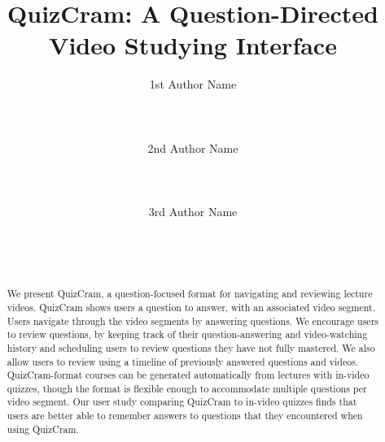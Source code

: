 \documentclass{sigchi}
\begin{document}
\title{QuizCram: A Question-Directed Video Studying Interface}


\author{
  \alignauthor 1st Author Name\\
    \\
    \\
    \\
  \alignauthor 2nd Author Name\\
    \\
    \\
    \\
  \alignauthor 3rd Author Name\\
    \\
    \\
    \\
}

\maketitle

\begin{abstract}
We present QuizCram, a question-focused format for navigating and reviewing lecture videos.
QuizCram shows users a question to answer, with an associated video segment.
Users navigate through the video segments by answering questions.
We encourage users to review questions, by keeping track of their question-answering and video-watching history
and scheduling users to review questions they have not fully mastered.
We also allow users to review using a timeline of previously answered questions and videos.
QuizCram-format courses can be generated automatically from lectures with in-video quizzes,
though the format is flexible enough to accommodate multiple questions per video segment.
Our user study comparing QuizCram to in-video quizzes finds that users
are better able to remember answers to questions that they encountered
when using QuizCram.


\end{abstract}
\end{document}
